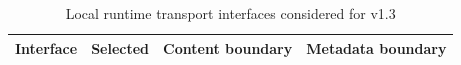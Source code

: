 
\begin{table}[htbp]
\centering
\caption{Local runtime transport interfaces considered for v1.3}
\label{tab:local-runtime-interface}
\begin{tabular}{llll}
\hline
Interface & Selected & Content boundary & Metadata boundary \\
\hline
\hline
\end{tabular}
\end{table}
